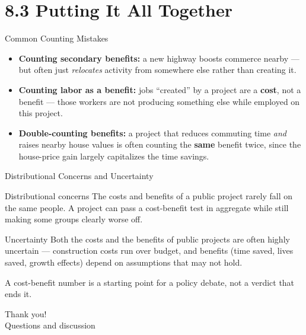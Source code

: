 \documentclass[11pt,aspectratio=169]{beamer}
\begin{document}
\section{8.3 Putting It All Together}

\begin{frame}{Common Counting Mistakes}
  \small
  \begin{itemize}
    \item \textbf{Counting secondary benefits:} a new highway boosts commerce nearby --- but often just \emph{relocates} activity from somewhere else rather than creating it.
    \item \textbf{Counting labor as a benefit:} jobs ``created'' by a project are a \textbf{cost}, not a benefit --- those workers are not producing something else while employed on this project.
    \item \textbf{Double-counting benefits:} a project that reduces commuting time \emph{and} raises nearby house values is often counting the \textbf{same} benefit twice, since the house-price gain largely capitalizes the time savings.
  \end{itemize}
\end{frame}

\begin{frame}{Distributional Concerns and Uncertainty}
  \begin{block}{Distributional concerns}
    The costs and benefits of a public project rarely fall on the same people. A project can pass a cost-benefit test in aggregate while still making some groups clearly worse off.
  \end{block}
  \begin{block}{Uncertainty}
    Both the costs and the benefits of public projects are often highly uncertain --- construction costs run over budget, and benefits (time saved, lives saved, growth effects) depend on assumptions that may not hold.
  \end{block}
  \vspace{0.4em}
  \small A cost-benefit number is a starting point for a policy debate, not a verdict that ends it.
\end{frame}



\begin{frame}[standout]
  Thank you!\\
  \vspace{0.5em}
  \small Questions and discussion
\end{frame}
\end{document}
